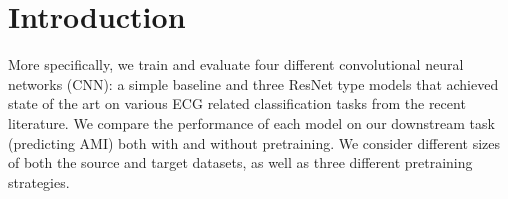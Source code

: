 \documentclass[journal,twoside,web]{ieeecolor}
\begin{document}
\section{Introduction}
\label{sec:introduction}





More specifically, we train and evaluate four different convolutional neural networks (CNN): a simple baseline and three ResNet type models that achieved state of the art on various ECG related classification tasks from the recent literature. We compare the performance of each model on our downstream task (predicting AMI) both with and without pretraining. We consider different sizes of both the source and target datasets, as well as three different pretraining strategies.
\end{document}
